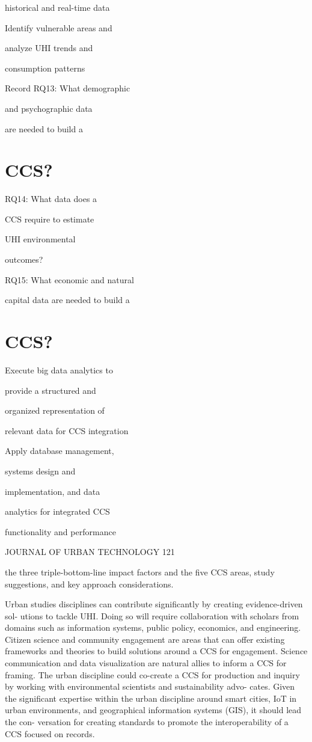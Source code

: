 \documentclass[10pt,a4paper]{article}
\begin{document}
historical and real-time data

Identify vulnerable areas and

analyze UHI trends and

consumption patterns

Record RQ13: What demographic

and psychographic data

are needed to build a


\section{CCS?}

RQ14: What data does a

CCS require to estimate

UHI environmental

outcomes?

RQ15: What economic and natural

capital data are needed to build a


\section{CCS?}

Execute big data analytics to

provide a structured and

organized representation of

relevant data for CCS integration

Apply database management,

systems design and

implementation, and data

analytics for integrated CCS

functionality and performance

JOURNAL OF URBAN TECHNOLOGY 121

the three triple-bottom-line impact factors and the ﬁve CCS areas, study suggestions, and key approach considerations.

Urban studies disciplines can contribute signiﬁcantly by creating evidence-driven sol- utions to tackle UHI. Doing so will require collaboration with scholars from domains such as information systems, public policy, economics, and engineering. Citizen science and community engagement are areas that can oﬀer existing frameworks and theories to build solutions around a CCS for engagement. Science communication and data visualization are natural allies to inform a CCS for framing. The urban discipline could co-create a CCS for production and inquiry by working with environmental scientists and sustainability advo- cates. Given the signiﬁcant expertise within the urban discipline around smart cities, IoT in urban environments, and geographical information systems (GIS), it should lead the con- versation for creating standards to promote the interoperability of a CCS focused on records.
\end{document}
